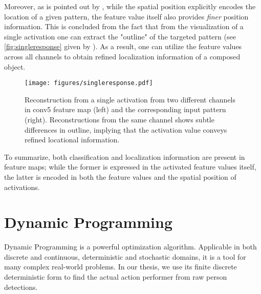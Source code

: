 Moreover, as is pointed out by \cite{kaiminghe}, while the spatial position explicitly encodes the location of a given pattern, the feature value itself also provides \textit{finer} position information.
This is concluded from the fact that from the visualization of a single activation one can extract the "outline" of the targeted pattern (see \autoref{fig:singleresponse} given by \cite{zeiler2014visualizing}).
As a result, one can utilize the feature values across all channels to obtain refined localization information of a composed object.

\begin{figure}[ht]
\centering
\texttt{[image: figures/singleresponse.pdf]}
\caption[Single response visualization]{Reconstruction from a single activation from two different channels in conv5 feature map (left) and the corresponding input pattern (right). Reconstructions from the same channel shows subtle differences in outline, implying that the activation value conveys refined locational information.}\label{fig:singleresponse}
\end{figure}

To summarize, both classification and localization information are present in feature maps; while the former is expressed in the activated feature values itself, the latter is encoded in both the feature values and the spatial position of activations.

\section{Dynamic Programming}\label{sec:dp}
Dynamic Programming is a powerful optimization algorithm. Applicable in both discrete and continuous, deterministic and stochastic domains, it is a tool for many complex real-world problems.
In our thesis, we use its finite discrete deterministic form to find the actual action performer from raw person detections.

